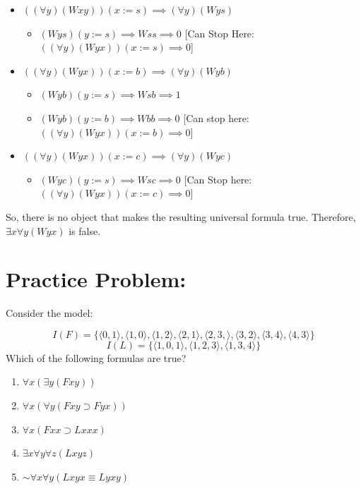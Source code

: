 \documentclass[
]{book}
\providecommand{\tightlist}{%
  \setlength{\itemsep}{0pt}\setlength{\parskip}{0pt}}
\begin{document}
\begin{itemize}
\tightlist
\item
  \(((\forall y)(Wxy))(x:= s) \implies (\forall y)(Wys)\)

  \begin{itemize}
  \tightlist
  \item
    \((Wys)(y:=s) \implies Wss \implies 0\) {[}Can Stop Here: \(((\forall y)(Wyx))(x:=s) \implies 0\){]}
  \end{itemize}
\item
  \(((\forall y)(Wyx))(x:=b) \implies (\forall y)(Wyb)\)

  \begin{itemize}
  \tightlist
  \item
    \((Wyb)(y:=s) \implies Wsb \implies 1\)
  \item
    \((Wyb)(y:=b) \implies Wbb \implies 0\) {[}Can stop here: \(((\forall y)(Wyx))(x:=b) \implies 0\){]}
  \end{itemize}
\item
  \(((\forall y)(Wyx))(x:=c) \implies (\forall y)(Wyc)\)

  \begin{itemize}
  \tightlist
  \item
    \((Wyc)(y:=s) \implies Wsc \implies 0\) {[}Can Stop here: \(((\forall y)(Wyx))(x:=c) \implies 0\){]}
  \end{itemize}
\end{itemize}

So, there is no object that makes the resulting universal formula true. Therefore, \(\exists x\forall y(Wyx)\) is false.

\hypertarget{practice-problem}{%
\section{Practice Problem:}\label{practice-problem}}

Consider the model:

\[
I(F) = \{\langle 0,1\rangle, \langle 1,0\rangle, \langle 1,2\rangle, \langle 2,1\rangle, \langle 2,3,\rangle, \langle 3,2\rangle, \langle 3,4\rangle, \langle 4,3\rangle \}
\]
\[
I(L) = \{\langle 1,0,1\rangle, \langle 1,2,3\rangle,\langle 1,3,4\rangle\}
\]
Which of the following formulas are true?

\begin{enumerate}
\def\labelenumi{\arabic{enumi}.}
\tightlist
\item
  \(\forall x(\exists y (Fxy))\)
\item
  \(\forall x (\forall y (Fxy \supset Fyx))\)
\item
  \(\forall x (Fxx \supset Lxxx)\)
\item
  \(\exists x \forall y \forall z(Lxyz)\)
\item
  \(\sim \forall x \forall y (Lxyx \equiv Lyxy)\)
\end{enumerate}
\end{document}

